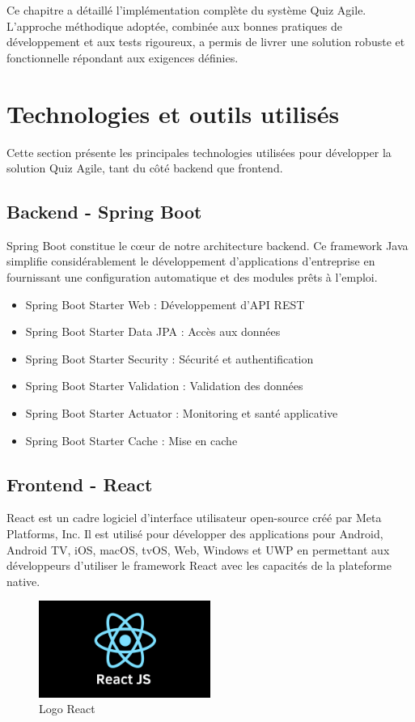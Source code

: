 \documentclass[12pt,a4paper]{report}
\begin{document}
Ce chapitre a détaillé l'implémentation complète du système Quiz Agile. L'approche méthodique adoptée, combinée aux bonnes pratiques de développement et aux tests rigoureux, a permis de livrer une solution robuste et fonctionnelle répondant aux exigences définies.

\section{Technologies et outils utilisés}

Cette section présente les principales technologies utilisées pour développer la solution Quiz Agile, tant du côté backend que frontend.

\subsection{Backend - Spring Boot}

Spring Boot constitue le cœur de notre architecture backend. Ce framework Java simplifie considérablement le développement d'applications d'entreprise en fournissant une configuration automatique et des modules prêts à l'emploi.

\begin{itemize}
    \item Spring Boot Starter Web : Développement d'API REST
    \item Spring Boot Starter Data JPA : Accès aux données
    \item Spring Boot Starter Security : Sécurité et authentification
    \item Spring Boot Starter Validation : Validation des données
    \item Spring Boot Starter Actuator : Monitoring et santé applicative
    \item Spring Boot Starter Cache : Mise en cache
\end{itemize}

\subsection{Frontend - React}

React est un cadre logiciel d'interface utilisateur open-source créé par Meta Platforms, Inc. Il est utilisé pour développer des applications pour Android, Android TV, iOS, macOS, tvOS, Web, Windows et UWP en permettant aux développeurs d'utiliser le framework React avec les capacités de la plateforme native.

\begin{figure}[H]
\centering
\includegraphics[width=0.5\textwidth]{latex_media/media/image24.png}
\caption{Logo React}
\label{fig:logo-react}
\end{figure}
\end{document}
